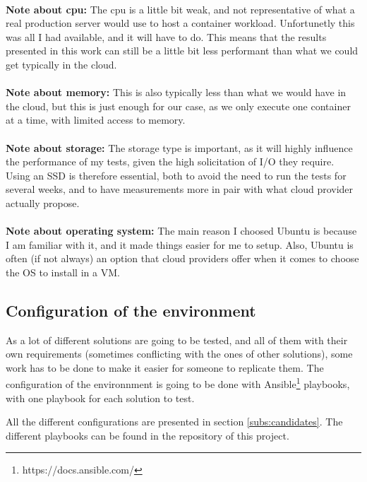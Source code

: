 \paragraph{}\textbf{Note about cpu:}  The cpu is a little bit weak, and not representative of what a real production server would use to host a container workload.  Unfortunetly this was all I had available, and it will have to do.  This means that the results presented in this work can still be a little bit less performant than what we could get typically in the cloud.
\paragraph{}\textbf{Note about memory:}  This is also typically less than what we would have in the cloud, but this is just enough for our case, as we only execute one container at a time, with limited access to memory.
\paragraph{}\textbf{Note about storage:}  The storage type is important, as it will highly influence the performance of my tests, given the high solicitation of I/O they require.  Using an SSD is therefore essential, both to avoid the need to run the tests for several weeks, and to have measurements more in pair with what cloud provider actually propose.
\paragraph{}\textbf{Note about operating system:}  The main reason I choosed Ubuntu is because I am familiar with it, and it made things easier for me to setup.  Also, Ubuntu is often (if not always) an option that cloud providers offer when it comes to choose the OS to install in a VM.

\subsection{Configuration of the environment}
As a lot of different solutions are going to be tested, and all of them with their own requirements (sometimes conflicting with the ones of other solutions), some work has to be done to make it easier for someone to replicate them.  The configuration of the environnment is going to be done with Ansible\footnote{https://docs.ansible.com/} playbooks, with one playbook for each solution to test.

All the different configurations are presented in section \ref{subs:candidates}.  The different playbooks can be found in the repository of this project. %

